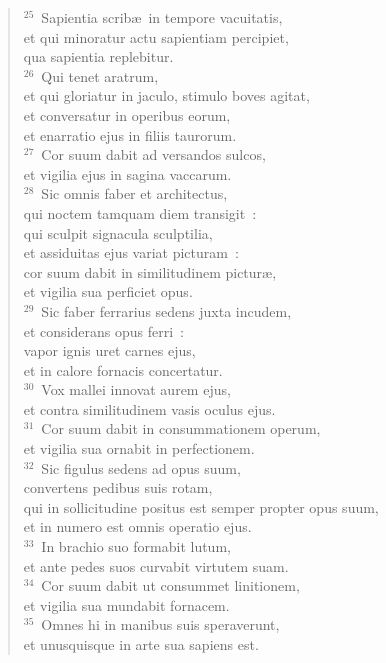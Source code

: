 \begin{verse}${}^{25}$~Sapientia scrib\ae\ in tempore vacuitatis,\\ et qui minoratur actu sapientiam percipiet,\\ qua sapientia replebitur.\\
${}^{26}$~Qui tenet aratrum,\\ et qui gloriatur in jaculo, stimulo boves agitat,\\ et conversatur in operibus eorum,\\ et enarratio ejus in filiis taurorum.\\
${}^{27}$~Cor suum dabit ad versandos sulcos,\\ et vigilia ejus in sagina vaccarum.\\
${}^{28}$~Sic omnis faber et architectus,\\ qui noctem tamquam diem transigit~:\\ qui sculpit signacula sculptilia,\\ et assiduitas ejus variat picturam~:\\ cor suum dabit in similitudinem pictur\ae ,\\ et vigilia sua perficiet opus.\\
${}^{29}$~Sic faber ferrarius sedens juxta incudem,\\ et considerans opus ferri~:\\ vapor ignis uret carnes ejus,\\ et in calore fornacis concertatur.\\
${}^{30}$~Vox mallei innovat aurem ejus,\\ et contra similitudinem vasis oculus ejus.\\
${}^{31}$~Cor suum dabit in consummationem operum,\\ et vigilia sua ornabit in perfectionem.\\
${}^{32}$~Sic figulus sedens ad opus suum,\\ convertens pedibus suis rotam,\\ qui in sollicitudine positus est semper propter opus suum,\\ et in numero est omnis operatio ejus.\\
${}^{33}$~In brachio suo formabit lutum,\\ et ante pedes suos curvabit virtutem suam.\\
${}^{34}$~Cor suum dabit ut consummet linitionem,\\ et vigilia sua mundabit fornacem.\\
${}^{35}$~Omnes hi in manibus suis speraverunt,\\ et unusquisque in arte sua sapiens est.\\

\end{verse}
